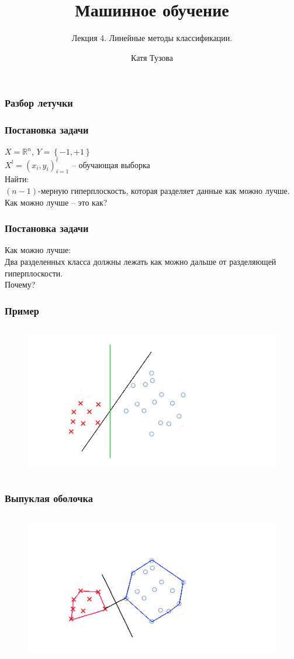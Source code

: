 \documentclass[12pt]{beamer}
\author{Катя Тузова}
\title{Машинное обучение}
\subtitle{Лекция 4. Линейные методы классификации.}
\date{}
\begin{document}
\frame{\titlepage}

\begin{frame}\frametitle{Разбор летучки}
\end{frame}


\begin{frame}\frametitle{Постановка задачи}
$X = \mathbb{R}^n$, ${Y = \left\{ -1, + 1\right\}}$\\
${X^l = (x_i, y_i)_{i = 1}^l}$ -- обучающая выборка\\
\vspace{5mm}Найти:\\
$(n-1)$-мерную гиперплоскость, которая разделяет данные как можно лучше.
\\ \vspace{5mm}
Как можно лучше -- это как?

\end{frame}

\begin{frame}\frametitle{Постановка задачи}
Как можно лучше:\\
Два разделенных класса должны лежать как можно дальше от разделяющей гиперплоскости.\\
\vspace{5mm} Почему?
\end{frame}

\begin{frame}\frametitle{Пример}
\begin{figure}[htbp]
  \includegraphics[height=190pt, keepaspectratio = true]{images/example}   
\end{figure}
\end{frame}

\begin{frame}\frametitle{Выпуклая оболочка}
\begin{figure}[htbp]
  \includegraphics[height=190pt, keepaspectratio = true]{images/example1}   
\end{figure}
\end{frame}
\end{document}
